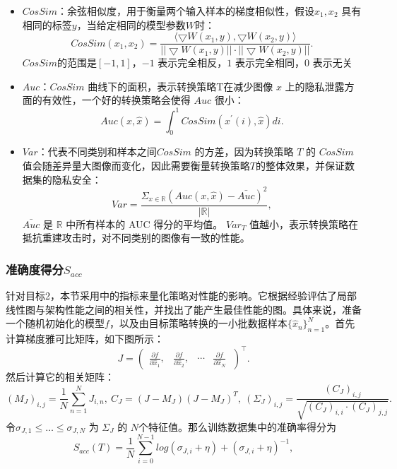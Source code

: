 \begin{itemize}
    \item $ CosSim$：余弦相似度，用于衡量两个输入样本的梯度相似性，假设$x_{1},x_{2}$ 具有相同的标签$y$，当给定相同的模型参数$W$时：\begin{equation}  {CosSim}(x_{1}, x_{2}) = \frac{\langle \bigtriangledown W(x_{1}, y), \bigtriangledown W(x_{2}, y) \rangle }{|| \bigtriangledown W(x_{1}, y) || \cdot || \bigtriangledown W(x_{2}, y) ||}. \end{equation}$ {CosSim}$的范围是$[-1, 1]$，$-1$ 表示完全相反，$1$ 表示完全相同，$0$ 表示无关
    \item $ {Auc}$：$ {CosSim}$ 曲线下的面积，表示转换策略T在减少图像 $x$ 上的隐私泄露方面的有效性，一个好的转换策略会使得 $Auc$ 很小：\begin{equation}  {Auc}(x, {\widehat{x}}) = \int _{0}^{1}  {CosSim}(x^{\prime }(i), {\widehat{x}}) di. \label{eq:AUC}\end{equation}
    \item $ {Var}$：代表不同类别和样本之间$ CosSim$ 的方差，因为转换策略 $T$ 的 $ CosSim$ 值会随差异量大图像而变化，因此需要衡量转换策略$T$的整体效果，并保证数据集的隐私安全：\begin{equation}  {Var}= \frac{\Sigma _{x\in \mathbb{R}} ( {Auc}(x, {\widehat{x}}) - \bar{ {Auc}})^{2}}{|\mathbb{R}|}, \end{equation} $\bar{ {Auc}}$ 是 $\mathbb{R}$ 中所有样本的 AUC 得分的平均值。 $ {Var}_{T}$ 值越小，表示转换策略在抵抗重建攻击时，对不同类别的图像有一致的性能。
\end{itemize}

\subsubsection{准确度得分$S_{acc}$}

针对目标2，本节采用\cite{Neural_architecture_search_without_training}中的指标来量化策略对性能的影响。它根据经验评估了局部线性图与架构性能之间的相关性，并找出了能产生最佳性能的图。具体来说，准备一个随机初始化的模型$f$，以及由目标策略转换的一小批数据样本$\lbrace \widehat{x}_{n}\rbrace _{n=1}^{N}$。首先计算梯度雅可比矩阵，如下图所示：
\begin{equation} J = {\begin{pmatrix}\frac{\partial f}{\partial \widehat{x}_{1}}, & \frac{\partial f}{\partial \widehat{x}_{2}}, & \cdots & \frac{\partial f}{\partial \widehat{x}_{N}} \ \end{pmatrix}}^{\top }. \end{equation}
然后计算它的相关矩阵：
\begin{equation} \left(M_{J}\right)_{ i, j} = \frac{1}{N} \sum _{n=1}^{N}J_{i, n}, \ C_{J} = (J-M_{J})(J-M_{J})^{T}, \ \left(\Sigma _{J}\right)_{i, j} = \frac{\left(C_{J}\right)_{i, j}}{\sqrt{\left(C_{J}\right)_{i, i} \cdot \left(C_{J}\right)_{j, j} }}.  \end{equation}
令$\sigma _{J, 1} \leq \ldots \leq \sigma _{J, N}$ 为 $\Sigma_{J}$ 的 $N$个特征值。那么训练数据集中的准确率得分为
\begin{equation} S_{acc}(T)=\frac{1}{N}\sum _{i=0}^{N-1} {log(\sigma _{J,i} + \eta) + (\sigma _{J,i} + \eta)^{-1}},  \end{equation}

